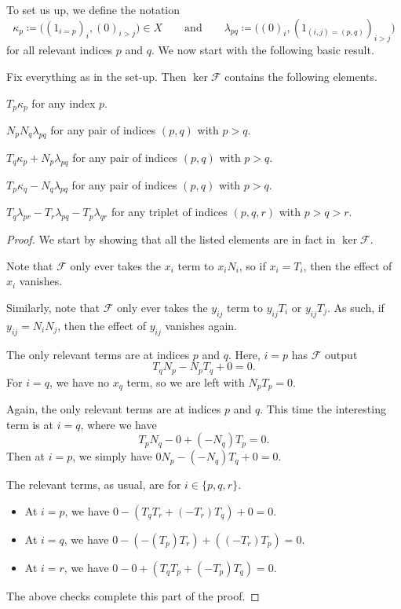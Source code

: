 \documentclass{article}
\numberwithin{equation}{section}
\begin{document}
To set us up, we define the notation
\[\kappa_p\coloneqq\big((1_{i=p})_i,(0)_{i>j}\big)\in X\qquad\text{and}\qquad\lambda_{pq}\coloneqq\big((0)_i,(1_{(i,j)=(p,q)})_{i>j}\big)\]
for all relevant indices $p$ and $q$. We now start with the following basic result.
\begin{lemma} \label{lem:getgens}
	Fix everything as in the set-up. Then $\ker\mathcal F$ contains the following elements.
	\begin{listalph}
		\item $T_p\kappa_p$ for any index $p$.
		\item $N_pN_q\lambda_{pq}$ for any pair of indices $(p,q)$ with $p>q$.
		\item $T_q\kappa_p+N_p\lambda_{pq}$ for any pair of indices $(p,q)$ with $p>q$.
		\item $T_p\kappa_q-N_q\lambda_{pq}$ for any pair of indices $(p,q)$ with $p>q$.
		\item $T_q\lambda_{pr}-T_r\lambda_{pq}-T_p\lambda_{qr}$ for any triplet of indices $(p,q,r)$ with $p>q>r$.
	\end{listalph}
\end{lemma}
\begin{proof}
	We start by showing that all the listed elements are in fact in $\ker\mathcal F$.
	\begin{listalph}
		\item Note that $\mathcal F$ only ever takes the $x_i$ term to $x_iN_i$, so if $x_i=T_i$, then the effect of $x_i$ vanishes.
		\item Similarly, note that $\mathcal F$ only ever takes the $y_{ij}$ term to $y_{ij}T_i$ or $y_{ij}T_j$. As such, if $y_{ij}=N_iN_j$, then the effect of $y_{ij}$ vanishes again.
		\item The only relevant terms are at indices $p$ and $q$. Here, $i=p$ has $\mathcal F$ output
		\[T_qN_p-N_pT_q+0=0.\]
		For $i=q$, we have no $x_q$ term, so we are left with $N_pT_p=0$.
		\item Again, the only relevant terms are at indices $p$ and $q$. This time the interesting term is at $i=q$, where we have
		\[T_pN_q-0+(-N_q)T_p=0.\]
		Then at $i=p$, we simply have $0N_p-(-N_q)T_q+0=0$.
		\item The relevant terms, as usual, are for $i\in\{p,q,r\}$.
		\begin{itemize}
			\item At $i=p$, we have $0-(T_qT_r+(-T_r)T_q)+0=0.$
			\item At $i=q$, we have $0-(-(T_p)T_r)+((-T_r)T_p)=0$.
			\item At $i=r$, we have $0-0+(T_qT_p+(-T_p)T_q)=0$.
		\end{itemize}
	\end{listalph}
	The above checks complete this part of the proof.
\end{proof}
\end{document}

